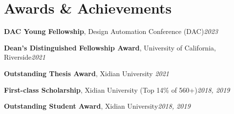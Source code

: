\documentclass[letterpaper,11pt]{article}
\makeatletter
\newcommand{\resumeItem}[1]{
  \item\small{
    {#1 \vspace{-2pt}}
  }
}
\newcommand{\resumeProjectHeading}[2]{
    \vspace{-2pt}\item
    \begin{tabular*}{0.97\textwidth}{l@{\extracolsep{\fill}}r}
      \small#1 & #2 \\
    \end{tabular*}\vspace{-7pt}
}
\newcommand{\resumeSubHeadingListStart}{\begin{itemize}[leftmargin=0.15in, label={}]}
\newcommand{\resumeSubHeadingListEnd}{\end{itemize}}
\newcommand{\resumeItemListStart}{\begin{itemize}}
\newcommand{\resumeItemListEnd}{\end{itemize}\vspace{-5pt}}
\makeatother
\begin{document}
\section{Awards \& Achievements}
  \vspace{2pt}
  \resumeSubHeadingListStart
    \small{\item{
        \textbf{DAC Young Fellowship}, Design Automation Conference (DAC)\hfill \textit{2023} \\ \vspace{3pt}
    
        \textbf{Dean’s Distinguished Fellowship Award}, University of California, Riverside\hfill \textit{2021} \\ \vspace{3pt}
        
        \textbf{Outstanding Thesis Award}, Xidian University \hfill \textit{2021} \\ \vspace{3pt}
        
        \textbf{First-class Scholarship}, Xidian University (Top 14\% of 560+)\hfill \textit{2018, 2019} \\ \vspace{3pt}
        
        \textbf{Outstanding Student Award}, Xidian University\hfill \textit{2018, 2019} \\ \vspace{3pt}
    }}
  \resumeSubHeadingListEnd




      
      
\end{document}
